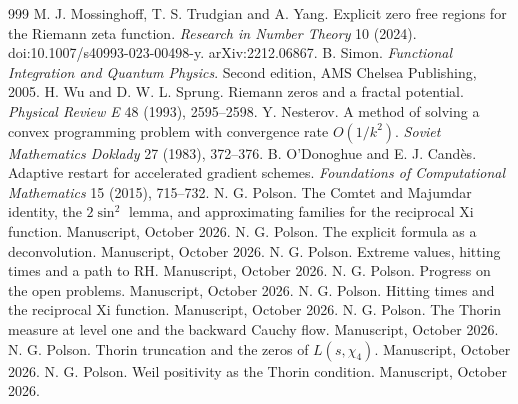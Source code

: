 \begin{thebibliography}{999}
 M. J. Mossinghoff, T. S. Trudgian and A. Yang. Explicit zero free regions for the Riemann zeta function. \emph{Research in Number Theory} 10 (2024). doi:10.1007/s40993-023-00498-y. arXiv:2212.06867.
 B. Simon. \emph{Functional Integration and Quantum Physics}. Second edition, AMS Chelsea Publishing, 2005. %
 H. Wu and D. W. L. Sprung. Riemann zeros and a fractal potential. \emph{Physical Review E} 48 (1993), 2595--2598. %
 Y. Nesterov. A method of solving a convex programming problem with convergence rate $O(1/k^2)$. \emph{Soviet Mathematics Doklady} 27 (1983), 372--376.
 B. O'Donoghue and E. J. Cand\`es. Adaptive restart for accelerated gradient schemes. \emph{Foundations of Computational Mathematics} 15 (2015), 715--732.
 N. G. Polson. The Comtet and Majumdar identity, the $2\sin^2$ lemma, and approximating families for the reciprocal Xi function. Manuscript, October 2026.
 N. G. Polson. The explicit formula as a deconvolution. Manuscript, October 2026.
 N. G. Polson. Extreme values, hitting times and a path to RH. Manuscript, October 2026.
 N. G. Polson. Progress on the open problems. Manuscript, October 2026.
 N. G. Polson. Hitting times and the reciprocal Xi function. Manuscript, October 2026.
 N. G. Polson. The Thorin measure at level one and the backward Cauchy flow. Manuscript, October 2026.
 N. G. Polson. Thorin truncation and the zeros of $L(s,\chi_4)$. Manuscript, October 2026.
 N. G. Polson. Weil positivity as the Thorin condition. Manuscript, October 2026.

\end{thebibliography}
